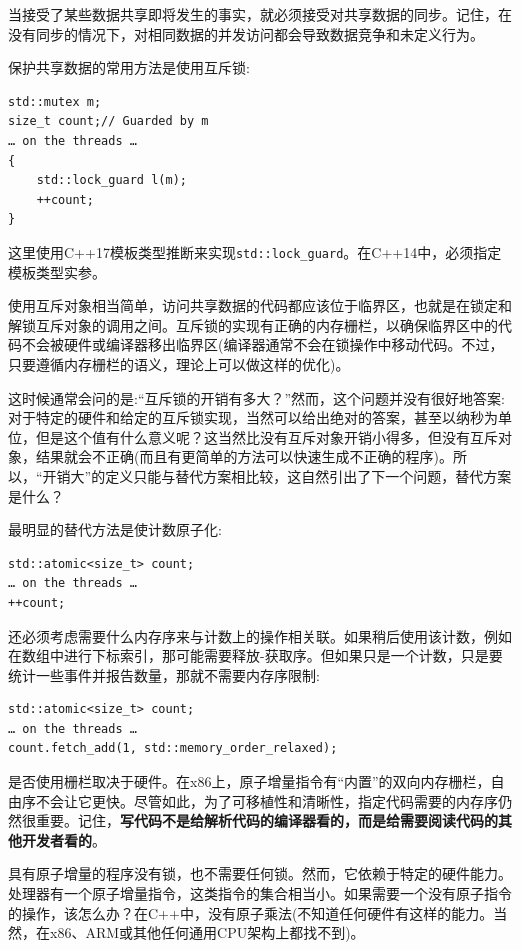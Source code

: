 
当接受了某些数据共享即将发生的事实，就必须接受对共享数据的同步。记住，在没有同步的情况下，对相同数据的并发访问都会导致数据竞争和未定义行为。

保护共享数据的常用方法是使用互斥锁:

\begin{lstlisting}[style=styleCXX]
std::mutex m;
size_t count;// Guarded by m
… on the threads …
{
	std::lock_guard l(m);
	++count;
}
\end{lstlisting}

这里使用C++17模板类型推断来实现\texttt{std::lock\_guard}。在C++14中，必须指定模板类型实参。

使用互斥对象相当简单，访问共享数据的代码都应该位于临界区，也就是在锁定和解锁互斥对象的调用之间。互斥锁的实现有正确的内存栅栏，以确保临界区中的代码不会被硬件或编译器移出临界区(编译器通常不会在锁操作中移动代码。不过，只要遵循内存栅栏的语义，理论上可以做这样的优化)。

这时候通常会问的是:“互斥锁的开销有多大？”然而，这个问题并没有很好地答案:对于特定的硬件和给定的互斥锁实现，当然可以给出绝对的答案，甚至以纳秒为单位，但是这个值有什么意义呢？这当然比没有互斥对象开销小得多，但没有互斥对象，结果就会不正确(而且有更简单的方法可以快速生成不正确的程序)。所以，“开销大”的定义只能与替代方案相比较，这自然引出了下一个问题，替代方案是什么？

最明显的替代方法是使计数原子化:

\begin{lstlisting}[style=styleCXX]
std::atomic<size_t> count;
… on the threads …
++count;
\end{lstlisting}

还必须考虑需要什么内存序来与计数上的操作相关联。如果稍后使用该计数，例如在数组中进行下标索引，那可能需要释放-获取序。但如果只是一个计数，只是要统计一些事件并报告数量，那就不需要内存序限制:

\begin{lstlisting}[style=styleCXX]
std::atomic<size_t> count;
… on the threads …
count.fetch_add(1, std::memory_order_relaxed);
\end{lstlisting}

是否使用栅栏取决于硬件。在x86上，原子增量指令有“内置”的双向内存栅栏，自由序不会让它更快。尽管如此，为了可移植性和清晰性，指定代码需要的内存序仍然很重要。记住，\textbf{写代码不是给解析代码的编译器看的，而是给需要阅读代码的其他开发者看的}。

具有原子增量的程序没有锁，也不需要任何锁。然而，它依赖于特定的硬件能力。处理器有一个原子增量指令，这类指令的集合相当小。如果需要一个没有原子指令的操作，该怎么办？在C++中，没有原子乘法(不知道任何硬件有这样的能力。当然，在x86、ARM或其他任何通用CPU架构上都找不到)。

